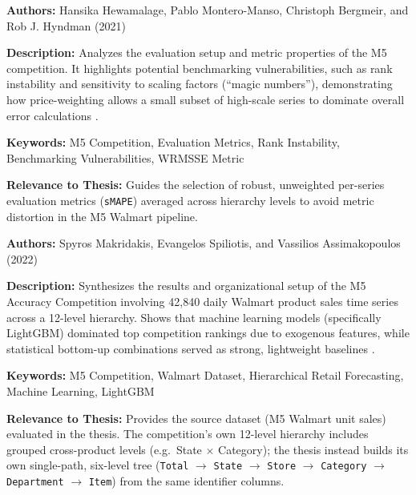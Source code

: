
{

	\textbf{Authors:}
	Hansika Hewamalage, Pablo Montero-Manso, Christoph Bergmeir, and Rob J. Hyndman (2021)

	\textbf{Description:}
	Analyzes the evaluation setup and metric properties of the M5 competition. It highlights potential benchmarking vulnerabilities, such as rank instability and sensitivity to scaling factors (``magic numbers''), demonstrating how price-weighting allows a small subset of high-scale series to dominate overall error calculations \autocite{Hewamalage:2021}.

	\textbf{Keywords:}
	M5 Competition, Evaluation Metrics, Rank Instability, Benchmarking Vulnerabilities, WRMSSE Metric

	\textbf{Relevance to Thesis:}
	Guides the selection of robust, unweighted per-series evaluation metrics (\texttt{sMAPE}) averaged across hierarchy levels to avoid metric distortion in the M5 Walmart pipeline.

}

{

	\textbf{Authors:}
	Spyros Makridakis, Evangelos Spiliotis, and Vassilios Assimakopoulos (2022)

	\textbf{Description:}
	Synthesizes the results and organizational setup of the M5 Accuracy Competition involving 42,840 daily Walmart product sales time series across a 12-level hierarchy. Shows that machine learning models (specifically LightGBM) dominated top competition rankings due to exogenous features, while statistical bottom-up combinations served as strong, lightweight baselines \autocite{Makridakis:2022}.

	\textbf{Keywords:}
	M5 Competition, Walmart Dataset, Hierarchical Retail Forecasting, Machine Learning, LightGBM

	\textbf{Relevance to Thesis:}
	Provides the source dataset (M5 Walmart unit sales) evaluated in the thesis. The competition's own 12-level hierarchy includes grouped cross-product levels (e.g.\ State \(\times\) Category); the thesis instead builds its own single-path, six-level tree (\texttt{Total} \(\rightarrow\) \texttt{State} \(\rightarrow\) \texttt{Store} \(\rightarrow\) \texttt{Category} \(\rightarrow\) \texttt{Department} \(\rightarrow\) \texttt{Item}) from the same identifier columns.

}


